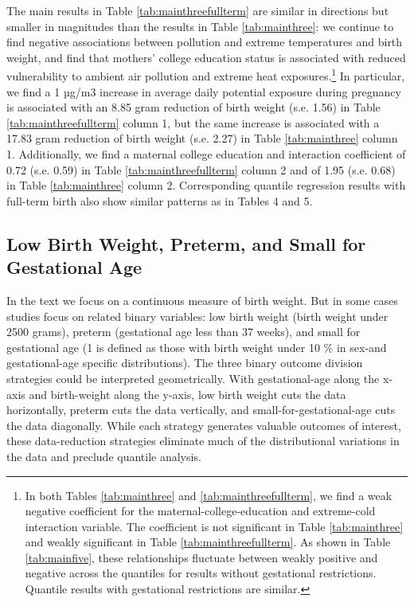 The main results in Table \ref{tab:mainthreefullterm}  are similar in directions but smaller in magnitudes than the results in Table \ref{tab:mainthree}: we continue to find negative associations between pollution and extreme temperatures and birth weight, and find that mothers' college education status is associated with reduced vulnerability to ambient air pollution and extreme heat exposures.\footnote{In both Tables \ref{tab:mainthree} and \ref{tab:mainthreefullterm}, we find a weak negative coefficient for the maternal-college-education and extreme-cold interaction variable. The coefficient is not significant in Table \ref{tab:mainthree} and weakly significant in Table \ref{tab:mainthreefullterm}. As shown in Table \ref{tab:mainfive}, these relationships fluctuate between weakly positive and negative across the quantiles for results without gestational restrictions. Quantile results with gestational restrictions are similar.} In particular, we find a 1 µg/m3 increase in average daily \PARPMTEN potential exposure during pregnancy is associated with an 8.85 gram reduction of birth weight (s.e. 1.56) in Table \ref{tab:mainthreefullterm} column 1, but the same increase is associated with a 17.83 gram reduction of birth weight (s.e. 2.27) in Table \ref{tab:mainthree} column 1. Additionally, we find a maternal college education and \PARPMTEN interaction coefficient of 0.72 (s.e. 0.59) in Table \ref{tab:mainthreefullterm} column 2 and of 1.95 (s.e. 0.68) in Table \ref{tab:mainthree} column 2. Corresponding quantile regression results with full-term birth also show similar patterns as in Tables 4 and 5. 



\subsection{Low Birth Weight, Preterm, and Small for Gestational Age\label{sec:appbinary}}

In the text we focus on a continuous measure of birth weight. But in some cases studies focus on related binary variables:  low birth weight (birth weight  under 2500 grams), preterm (gestational age less than 37 weeks), and small for gestational age (1 is defined as those with birth weight under 10 \% in sex-and gestational-age specific distributions). The three binary outcome division strategies could be interpreted geometrically. With gestational-age along the x-axis and birth-weight along the y-axis, low birth weight cuts the data horizontally, preterm cuts the data vertically, and small-for-gestational-age cuts the data diagonally. While each strategy generates valuable outcomes of interest, these data-reduction strategies eliminate much of the distributional variations in the data and preclude quantile analysis. 

